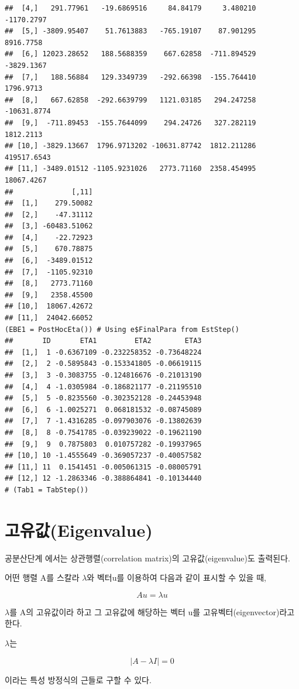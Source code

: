\documentclass[
  10pt,
]{krantz}
\begin{document}
\begin{verbatim}
##  [4,]   291.77961   -19.6869516     84.84179     3.480210  -1170.2797
##  [5,] -3809.95407    51.7613883   -765.19107    87.901295   8916.7758
##  [6,] 12023.28652   188.5688359    667.62858  -711.894529  -3829.1367
##  [7,]   188.56884   129.3349739   -292.66398  -155.764410   1796.9713
##  [8,]   667.62858  -292.6639799   1121.03185   294.247258 -10631.8774
##  [9,]  -711.89453  -155.7644099    294.24726   327.282119   1812.2113
## [10,] -3829.13667  1796.9713202 -10631.87742  1812.211286 419517.6543
## [11,] -3489.01512 -1105.9231026   2773.71160  2358.454995  18067.4267
##              [,11]
##  [1,]    279.50082
##  [2,]    -47.31112
##  [3,] -60483.51062
##  [4,]    -22.72923
##  [5,]    670.78875
##  [6,]  -3489.01512
##  [7,]  -1105.92310
##  [8,]   2773.71160
##  [9,]   2358.45500
## [10,]  18067.42672
## [11,]  24042.66052
(EBE1 = PostHocEta()) # Using e$FinalPara from EstStep()
##       ID       ETA1         ETA2        ETA3
##  [1,]  1 -0.6367109 -0.232258352 -0.73648224
##  [2,]  2 -0.5895843 -0.153341805 -0.06619115
##  [3,]  3 -0.3083755 -0.124816676 -0.21013190
##  [4,]  4 -1.0305984 -0.186821177 -0.21195510
##  [5,]  5 -0.8235560 -0.302352128 -0.24453948
##  [6,]  6 -1.0025271  0.068181532 -0.08745089
##  [7,]  7 -1.4316285 -0.097903076 -0.13802639
##  [8,]  8 -0.7541785 -0.039239022 -0.19621190
##  [9,]  9  0.7875803  0.010757282 -0.19937965
## [10,] 10 -1.4555649 -0.369057237 -0.40057582
## [11,] 11  0.1541451 -0.005061315 -0.08005791
## [12,] 12 -1.2863346 -0.388864841 -0.10134440
# (Tab1 = TabStep())
\end{verbatim}

\hypertarget{uxace0uxc720uxac12eigenvalue}{%
\section{고유값(Eigenvalue)}\label{uxace0uxc720uxac12eigenvalue}}

공분산단계 에서는 상관행렬(correlation matrix)의 고유값(eigenvalue)도 출력된다.

어떤 행렬 A를 스칼라 \(\lambda\)와 벡터u를 이용하여 다음과 같이 표시할 수 있을 때,

\[Au = \lambda u\]

\(\lambda\)를 A의 고유값이라 하고 그 고유값에 해당하는 벡터 u를 고유벡터(eigenvector)라고 한다.

\(\lambda\)는

\[\left| A - \lambda I \right| = 0\]

이라는 특성 방정식의 근들로 구할 수 있다.
\end{document}
